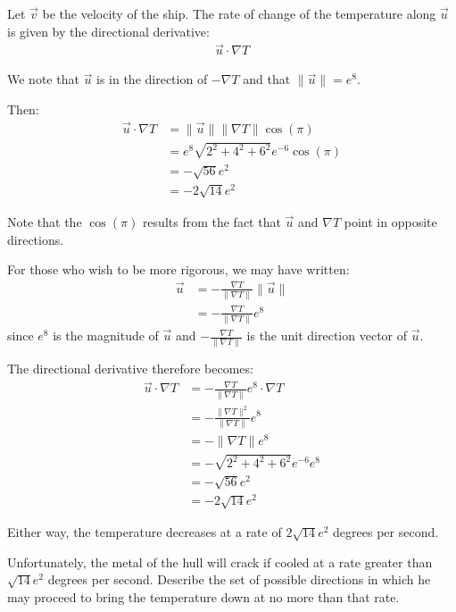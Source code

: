 \begin{solution}
    Let \(\vec{v}\) be the velocity of the ship. The rate of change of the temperature along \(\vec{u}\) is given by the directional derivative:
    \begin{align}
        \vec{u} \cdot \nabla T
    \end{align}
    
    We note that \(\vec{u}\) is in the direction of \(-\nabla T\) and that \(\|\vec{u}\| = e^8\). 
    
    Then:
    \begin{align*}
        \vec{u} \cdot \nabla T &= \|\vec{u}\|\|\nabla T\| \cos(\pi) \\
        &= e^8\sqrt{2^2 + 4^2 + 6^2}e^{-6} \cos(\pi) \\
        &= -\sqrt{56}e^2 \\
        &= - 2\sqrt{14}e^2
    \end{align*}
    
    Note that the \(\cos(\pi)\) results from the fact that \(\vec{u}\) and \(\nabla T\) point in opposite directions. 
    
    For those who wish to be more rigorous, we may have written:
    \begin{align}
        \vec{u} &= -\frac{\nabla T}{\|\nabla T\|}\|\vec{u}\| \\
        &= -\frac{\nabla T}{\|\nabla T\|}e^8
    \end{align}
    since \(e^8\) is the magnitude of \(\vec{u}\) and \(-\frac{\nabla T}{\|\nabla T\|}\) is the unit direction vector of \(\vec{u}\). 
    
    The directional derivative therefore becomes:
    \begin{align*}
        \vec{u} \cdot \nabla T &= -\frac{\nabla T}{\|\nabla T\|}e^8 \cdot \nabla T \\
        &= -\frac{\|\nabla T\|^2}{\|\nabla T\|}e^8 \\
        &= -\|\nabla T\| e^8 \\
        &= -\sqrt{2^2 + 4^2 + 6^2} e^{-6} e^8 \\
        &= -\sqrt{56}e^2 \\
        &= - 2\sqrt{14}e^2
    \end{align*}
    
    Either way, the temperature decreases at a rate of \(2\sqrt{14}e^2\) degrees per second.
\end{solution}

\begin{tcolorbox}[
        title={Problem 22 (c)},
        valign=center,
        nobeforeafter,
        colframe=gray!95!black
    ]
Unfortunately, the metal of the hull will crack if
cooled at a rate greater than \(\sqrt{14}e^2\) degrees per
second. Describe the set of possible directions in
which he may proceed to bring the temperature
down at no more than that rate.
\end{tcolorbox}

